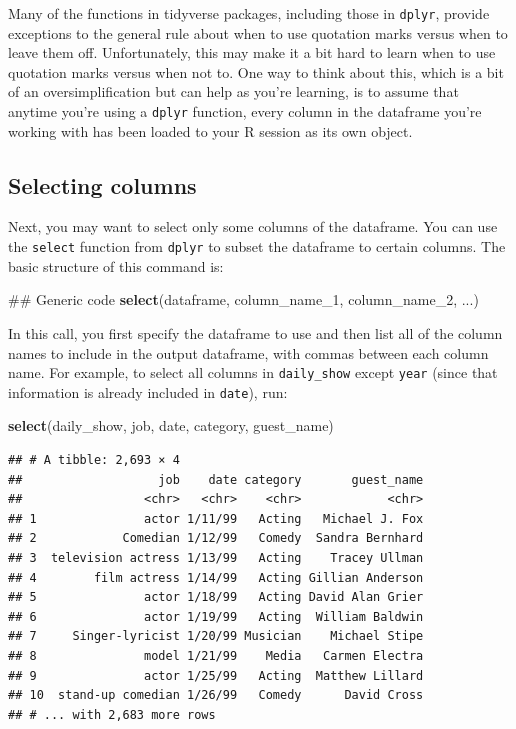 \documentclass[]{book}
\makeatletter
\newenvironment{Shaded}{\begin{snugshade}}{\end{snugshade}}
\newcommand{\KeywordTok}[1]{\textcolor[rgb]{0.13,0.29,0.53}{\textbf{{#1}}}}
\newcommand{\NormalTok}[1]{{#1}}
\newenvironment{kframe}{%
\medskip{}
\setlength{\fboxsep}{.8em}
 \def\at@end@of@kframe{}%
 \ifinner\ifhmode%
  \def\at@end@of@kframe{\end{minipage}}%
  \begin{minipage}{\columnwidth}%
 \fi\fi%
 \def\FrameCommand##1{\hskip\@totalleftmargin \hskip-\fboxsep
 \colorbox{shadecolor}{##1}\hskip-\fboxsep
     \hskip-\linewidth \hskip-\@totalleftmargin \hskip\columnwidth}%
 \MakeFramed {\advance\hsize-\width
   \@totalleftmargin\z@ \linewidth\hsize
   \@setminipage}}%
 {\par\unskip\endMakeFramed%
 \at@end@of@kframe}
\renewenvironment{Shaded}{\begin{kframe}}{\end{kframe}}
\newenvironment{rmdblock}[1]
  {
  \begin{itemize}
  \renewcommand{\labelitemi}{
    \raisebox{-.7\height}[0pt][0pt]{
      {\setkeys{Gin}{width=3em,keepaspectratio}\texttt{[image: images/\#1]}}
    }
  }
  \setlength{\fboxsep}{1em}
  \begin{kframe}
  \item
  }
  {
  \end{kframe}
  \end{itemize}
  }
\newenvironment{rmdwarning}
  {\begin{rmdblock}{warning}}
  {\end{rmdblock}}
\makeatother
\begin{document}
\begin{rmdwarning}
Many of the functions in tidyverse packages, including those in
\texttt{dplyr}, provide exceptions to the general rule about when to use
quotation marks versus when to leave them off. Unfortunately, this may
make it a bit hard to learn when to use quotation marks versus when not
to. One way to think about this, which is a bit of an oversimplification
but can help as you're learning, is to assume that anytime you're using
a \texttt{dplyr} function, every column in the dataframe you're working
with has been loaded to your R session as its own object.
\end{rmdwarning}

\subsection{Selecting columns}\label{selecting-columns}

Next, you may want to select only some columns of the dataframe. You can
use the \texttt{select} function from \texttt{dplyr} to subset the
dataframe to certain columns. The basic structure of this command is:

\begin{Shaded}
\begin{Highlighting}[]
\NormalTok{## Generic code}
\KeywordTok{select}\NormalTok{(dataframe, column_name_1, column_name_2, ...)}
\end{Highlighting}
\end{Shaded}

In this call, you first specify the dataframe to use and then list all
of the column names to include in the output dataframe, with commas
between each column name. For example, to select all columns in
\texttt{daily\_show} except \texttt{year} (since that information is
already included in \texttt{date}), run:

\begin{Shaded}
\begin{Highlighting}[]
\KeywordTok{select}\NormalTok{(daily_show, job, date, category, guest_name)}
\end{Highlighting}
\end{Shaded}

\begin{verbatim}
## # A tibble: 2,693 × 4
##                   job    date category       guest_name
##                 <chr>   <chr>    <chr>            <chr>
## 1               actor 1/11/99   Acting   Michael J. Fox
## 2            Comedian 1/12/99   Comedy  Sandra Bernhard
## 3  television actress 1/13/99   Acting    Tracey Ullman
## 4        film actress 1/14/99   Acting Gillian Anderson
## 5               actor 1/18/99   Acting David Alan Grier
## 6               actor 1/19/99   Acting  William Baldwin
## 7     Singer-lyricist 1/20/99 Musician    Michael Stipe
## 8               model 1/21/99    Media   Carmen Electra
## 9               actor 1/25/99   Acting  Matthew Lillard
## 10  stand-up comedian 1/26/99   Comedy      David Cross
## # ... with 2,683 more rows
\end{verbatim}
\end{document}
